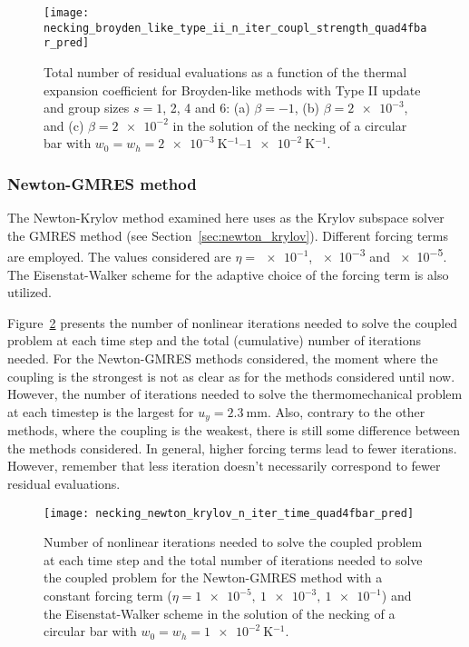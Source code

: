 \begin{figure}[htbp]
 \centering
 \texttt{[image: necking\_broyden\_like\_type\_ii\_n\_iter\_coupl\_strength\_quad4fbar\_pred]}
 \caption{Total number of residual evaluations as a function of the thermal expansion coefficient for Broyden-like methods with Type II update and group sizes \(s=1\), 2, 4 and 6: (a) \(\beta=-1\), (b) \(\beta=\num{2e-3}\), and (c) \(\beta=\num{2e-2}\) in the solution of the necking of a circular bar with \(w_0=w_h=\SIrange{2e-3}{1e-2}{\kelvin^{-1}}\).}
\label{fig:necking_broyden_like_type_ii_n_iter_coupl_strength_quad4fbar_pred}
\end{figure}

\FloatBarrier

\subsubsection{Newton-GMRES method}

The Newton-Krylov method examined here uses as the Krylov subspace solver the GMRES method (see Section~\ref{sec:newton_krylov}).
Different forcing terms are employed.
The values considered are \(\eta=\num[print-unity-mantissa=false]{e-1}\), \num[print-unity-mantissa=false]{e-3} and \num[print-unity-mantissa=false]{e-5}.
The Eisenstat-Walker scheme for the adaptive choice of the forcing term is also utilized.

Figure~\ref{fig:necking_newton_krylov_n_iter_time_quad4fbar_pred} presents the number of nonlinear iterations needed to solve the coupled problem at each time step and the total (cumulative) number of iterations needed.
For the Newton-GMRES methods considered, the moment where the coupling is the strongest is not as clear as for the methods considered until now.
However, the number of iterations needed to solve the thermomechanical problem at each timestep is the largest for \(u_y = \SI{2.3}{\milli\meter}\).
Also, contrary to the other methods, where the coupling is the weakest, there is still some difference between the methods considered.
In general, higher forcing terms lead to fewer iterations.
However, remember that less iteration doesn't necessarily correspond to fewer residual evaluations.

\begin{figure}
 \centering
 \texttt{[image: necking\_newton\_krylov\_n\_iter\_time\_quad4fbar\_pred]}
 \caption{Number of nonlinear iterations needed to solve the coupled problem at each time step and the total number of iterations needed to solve the coupled problem for the Newton-GMRES method with a constant forcing term (\(\eta=\num{1e-5},\ \num{1e-3},\ \num{1e-1}\)) and the Eisenstat-Walker scheme in the solution of the necking of a circular bar with \(w_0=w_h=\SI{1e-2}{\kelvin^{-1}}\).}
\label{fig:necking_newton_krylov_n_iter_time_quad4fbar_pred}
\end{figure}


